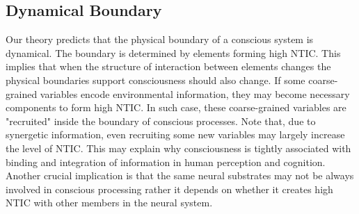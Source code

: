 		\subsection{Dynamical Boundary}
		Our theory predicts that the physical boundary of a conscious system is dynamical. The boundary is determined by elements forming high NTIC. This implies that when the structure of interaction between elements changes the physical boundaries support consciousness should also change. If some coarse-grained variables encode environmental information, they may become necessary components to form high NTIC. In such case, these coarse-grained variables are "recruited" inside the boundary of conscious processes. Note that, due to synergetic information, even recruiting some new variables may largely increase the level of NTIC. 
		This may explain why consciousness is tightly associated with binding and integration of information in human perception and cognition. Another crucial implication is that the same neural substrates may not be always involved in conscious processing rather it depends on whether it creates high NTIC with other members in the neural system. 
	
\rlend